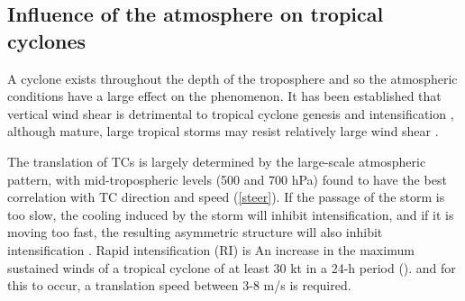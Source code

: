 



\subsection{Influence of the atmosphere on tropical cyclones}
A cyclone exists throughout the depth of the troposphere and so the atmospheric conditions have a large effect on the phenomenon. It has been established that vertical wind shear is detrimental to tropical cyclone genesis and intensification \citep[e.g.][]{chan1982tropical, McBride1995}, although mature, large tropical storms may resist relatively large wind shear \citep{zeng2007environmental}.


The translation of TCs is largely determined by the large-scale atmospheric pattern, with mid-tropospheric levels (500 and 700 hPa) found to have the best correlation with TC direction and speed \citep{chan1982tropical} (\ref{steer}). If the passage of the storm is too slow, the cooling induced by the storm will inhibit intensification, and if it is moving too fast, the resulting asymmetric structure will also inhibit intensification \citep{zeng2007environmental}. Rapid intensification (RI) is An increase in the maximum sustained winds of a tropical cyclone of at least 30 kt in a 24-h period (\citep{nhc_gloss}). and for this to occur, a translation speed between 3-8 m/s is required. %


